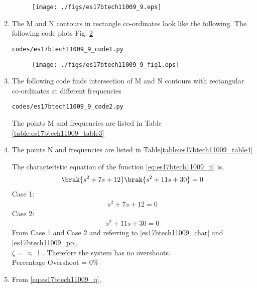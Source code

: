 \begin{enumerate}[label=\thesection.\arabic*.,ref=\thesection.\theenumi]
\begin{figure}[!h]
\texttt{[image: ./figs/es17btech11009\_9.eps]}
\caption{}
\label{fig:es17btech11009_9}
\end{figure}
\item
The M and N contours in rectangle co-ordinates look like the following.
The following code plots Fig. \ref{fig:es17btech11009_9_1}
\begin{lstlisting}
codes/es17btech11009_9_code1.py
\end{lstlisting}
\begin{figure}[!h]
\texttt{[image: ./figs/es17btech11009\_9\_fig1.eps]}
\caption{}
\label{fig:es17btech11009_9_1}
\end{figure}
\item 
The following code finds intersection of M and N contours with rectangular co-ordinates at different frequencies
\begin{lstlisting}
codes/es17btech11009_9_code2.py
\end{lstlisting}
The points M and frequencies are listed in Table  \ref{table:es17btech11009_table3}
\begin{table}[!ht]
\centering

\caption{}
\label{table:es17btech11009_table3}
\end{table}
\item
The points N and frequencies are listed in Table\ref{table:es17btech11009_table4}
\begin{table}[!ht]
\centering

\caption{}
\label{table:es17btech11009_table4}
\end{table}
The characteristic equation of the function \eqref{eq:es17btech11009_ii} is,
\begin{align}
 \brak{s^2 + 7s + 12} \brak{s^2 + 11s + 30} = 0
 \end{align}
 Case 1:
 \begin{align}
s^2 + 7s + 12 = 0 
\end{align}
Case 2:
 \begin{align}
s^2 + 11s + 30 =0
 \end{align}
From Case 1 and Case 2 and referring to \eqref{es17btech11009_char} and \eqref{es17btech11009_po},
\\
  $\zeta$ = $\approx$ 1 . Therefore the system has no overshoots.
  \\
  Percentage Overshoot = 0\%
\item
From \eqref{eq:es17btech11009_q},
\begin{align}

\end{align}
\end{enumerate}
